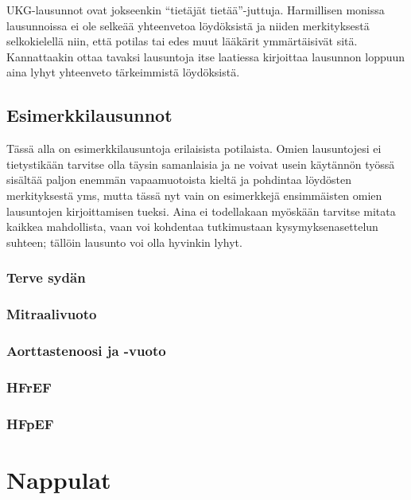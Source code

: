 \documentclass[
]{book}
\begin{document}
UKG-lausunnot ovat jokseenkin ``tietäjät tietää''-juttuja. Harmillisen monissa lausunnoissa ei ole selkeää yhteenvetoa löydöksistä ja niiden merkityksestä selkokielellä niin, että potilas tai edes muut lääkärit ymmärtäisivät sitä. Kannattaakin ottaa tavaksi lausuntoja itse laatiessa kirjoittaa lausunnon loppuun aina lyhyt yhteenveto tärkeimmistä löydöksistä.

\section{Esimerkkilausunnot}\label{esimerkkilausunnot}

Tässä alla on esimerkkilausuntoja erilaisista potilaista. Omien lausuntojesi ei tietystikään tarvitse olla täysin samanlaisia ja ne voivat usein käytännön työssä sisältää paljon enemmän vapaamuotoista kieltä ja pohdintaa löydösten merkityksestä yms, mutta tässä nyt vain on esimerkkejä ensimmäisten omien lausuntojen kirjoittamisen tueksi. Aina ei todellakaan myöskään tarvitse mitata kaikkea mahdollista, vaan voi kohdentaa tutkimustaan kysymyksenasettelun suhteen; tällöin lausunto voi olla hyvinkin lyhyt.

\subsection{Terve sydän}\label{terve-syduxe4n}

\subsection{Mitraalivuoto}\label{mitraalivuoto}

\subsection{Aorttastenoosi ja -vuoto}\label{aorttastenoosi-ja--vuoto}

\subsection{HFrEF}\label{hfref}

\subsection{HFpEF}\label{hfpef}

\chapter{Nappulat}\label{nappulat}
\end{document}
